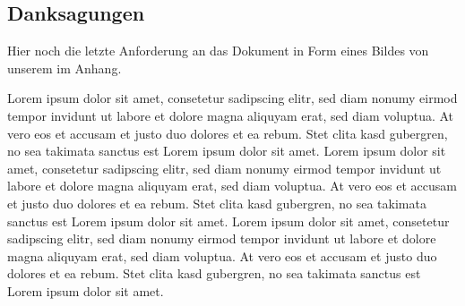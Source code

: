 

\setcounter{figure}{0}
\subsection{Danksagungen}

Hier noch die letzte Anforderung an das Dokument in Form eines Bildes von unserem  im Anhang.

Lorem ipsum dolor sit amet, consetetur sadipscing elitr, sed diam nonumy eirmod tempor invidunt ut 
labore et dolore magna aliquyam erat, sed diam voluptua. At vero eos et accusam et justo duo dolores et 
ea rebum. Stet clita kasd gubergren, no sea takimata sanctus est Lorem ipsum dolor sit amet. Lorem ipsum 
dolor sit amet, consetetur sadipscing elitr, sed diam nonumy eirmod tempor invidunt ut labore et dolore 
magna aliquyam erat, sed diam voluptua. At vero eos et accusam et justo duo dolores et ea rebum. Stet 
clita kasd gubergren, no sea takimata sanctus est Lorem ipsum dolor sit amet. Lorem ipsum dolor sit
amet, consetetur sadipscing elitr, sed diam nonumy eirmod tempor invidunt ut labore et dolore magna
aliquyam erat, sed diam voluptua. At vero eos et accusam et justo duo dolores et ea rebum. Stet 
clita kasd gubergren, no sea takimata sanctus est Lorem ipsum dolor sit amet.   

